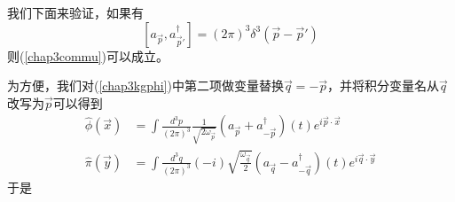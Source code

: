 我们下面来验证，如果有
\begin{equation}
    \left[a_{\vec{p}},a^{\dagger}_{\vec{p}'}\right]=(2\pi)^{3}\delta^{3}(\vec{p}-\vec{p}')
\end{equation}
则(\ref{chap3commu})可以成立。

为方便，我们对(\ref{chap3kgphi})中第二项做变量替换$\vec{q}=-\vec{p}$，并将积分变量名从$\vec{q}$改写为$\vec{p}$可以得到
\begin{equation}
\label{chap3kgphi2}
\begin{aligned}
    \hat{\phi}(\vec{x})&=\int \frac{d^{3}p}{(2\pi)^{3}}\frac{1}{\sqrt{2\omega_{\vec{p}}}}\left(a_{\vec{p}}+a^{\dagger}_{-\vec{p}}\right)(t)e^{i\vec{p}\cdot\vec{x}}\\
    \hat{\pi}(\vec{y})&=\int \frac{d^{3}q}{(2\pi)^{3}}(-i)\sqrt{\frac{\omega_{\vec{q}}}{2}}\left(a_{\vec{q}}-a^{\dagger}_{-\vec{q}}\right)(t)e^{i\vec{q}\cdot\vec{y}}
\end{aligned}
\end{equation}
于是
